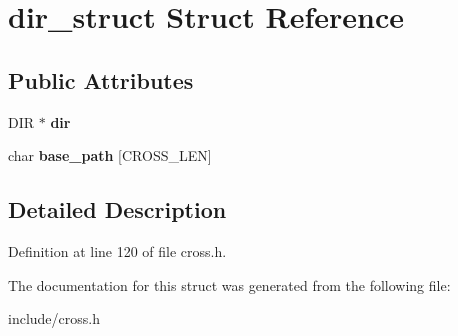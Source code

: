 \hypertarget{structdir__struct}{\section{dir\-\_\-struct Struct Reference}
\label{structdir__struct}
}
\subsection*{Public Attributes}
\begin{DoxyCompactItemize}
\item 
\hypertarget{structdir__struct_a972565488eed4eb755a2b2604e2fa9c5}{D\-I\-R $\ast$ {\bfseries dir}}\label{structdir__struct_a972565488eed4eb755a2b2604e2fa9c5}

\item 
\hypertarget{structdir__struct_a9cb3bc0a6f7312b318b93c25602ef196}{char {\bfseries base\-\_\-path} \mbox{[}C\-R\-O\-S\-S\-\_\-\-L\-E\-N\mbox{]}}\label{structdir__struct_a9cb3bc0a6f7312b318b93c25602ef196}

\end{DoxyCompactItemize}


\subsection{Detailed Description}


Definition at line 120 of file cross.\-h.



The documentation for this struct was generated from the following file\-:\begin{DoxyCompactItemize}
\item 
include/cross.\-h\end{DoxyCompactItemize}
